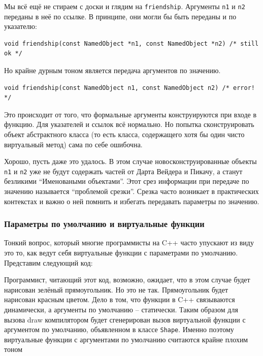 \documentclass[a4paper,12pt,oneside]{article}
\begin{document}
Мы всё ещё не стираем с доски и глядим на \lstinline!friendship!. Аргументы \lstinline!n1! и \lstinline!n2! переданы в неё по ссылке. В принципе, они могли бы быть переданы и по указателю:

\begin{lstlisting}
void friendship(const NamedObject *n1, const NamedObject *n2) /* still ok */
\end{lstlisting}

Но крайне дурным тоном является передача аргументов по значению.

\begin{lstlisting}
void friendship(const NamedObject n1, const NamedObject n2) /* error! */
\end{lstlisting}

Это происходит от того, что формальные аргументы конструируются при входе в функцию. Для указателей и ссылок всё нормально. Но попытка сконструировать объект абстрактного класса (то есть класса, содержащего хотя бы один чисто виртуальный метод) сама по себе ошибочна.

Хорошо, пусть даже это удалось. В этом случае новосконструированные объекты \lstinline!n1! и \lstinline!n2! уже не будут содержать частей от Дарта Вейдера и Пикачу, а станут безликими ``Именоваными объектами''. Этот срез информации при передаче по значению называется ``проблемой срезки''. Срезка часто возникает в практических контекстах и важно о ней помнить и избегать передавать параметры по значению.

\subsubsection{Параметры по умолчанию и виртуальные функции}

Тонкий вопрос, который многие программисты на C++ часто упускают из виду это то, как ведут себя виртуальные функции с параметрами по умолчанию. Представим следующий код:



Программист, читающий этот код, возможно, ожидает, что в этом случае будет нарисован зелёный прямоугольник. Но это не так. Прямоугольник будет нарисован красным цветом. Дело в том, что функции в C++ связываются динамически, а аргументы по умолчанию – статически. Таким образом для вызова draw компилятором будет сгенерирован вызов виртуальной функции с аргументом по умолчанию, объявленном в классе \lstinline!Shape!. Именно поэтому виртуальные функции с аргументами по умолчанию считаются крайне плохим тоном
\end{document}
